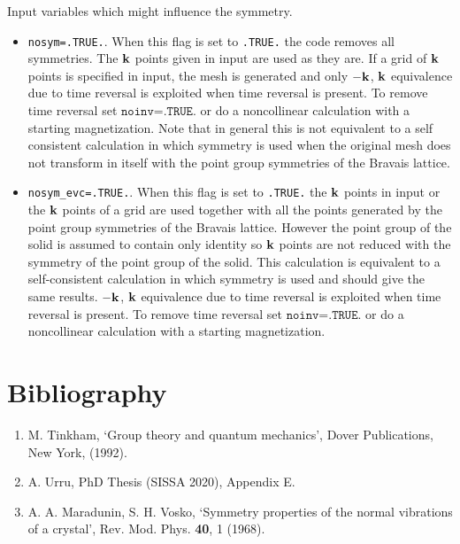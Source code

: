 \documentclass[12pt,a4paper,twoside]{report}
\begin{document}
Input variables which might influence the symmetry. 

\begin{itemize}
\item
\texttt{nosym=.TRUE.}. When this flag is set to \texttt{.TRUE.} the code 
removes all symmetries. The ${\bf k}$ points given in input are used as 
they are. If a grid of ${\bf k}$ points is specified in input, the mesh
is generated and only $-{\bf k}$, ${\bf k}$ 
equivalence due to time reversal is exploited when time reversal is present.
To remove time reversal set $\texttt{noinv=.TRUE.}$ or do a noncollinear
calculation with a starting magnetization. 
Note that in general this is not equivalent to a self consistent calculation
in which symmetry is used when the original mesh does not transform in
itself with the point group symmetries of the Bravais lattice.

\item
\texttt{nosym\_evc=.TRUE.}. When this flag is set to \texttt{.TRUE.}
the ${\bf k}$ points in input or the ${\bf k}$ points of a grid are
used together with all the points generated by the point group symmetries
of the Bravais lattice. However the point group of the solid is assumed
to contain only identity so ${\bf k}$ points are not reduced with
the symmetry of the point group of the solid. This calculation is 
equivalent to a self-consistent calculation in which symmetry is used
and should give the same results. $-{\bf k}$, ${\bf k}$
equivalence due to time reversal is exploited when time reversal is
present. To remove time reversal set $\texttt{noinv=.TRUE.}$ or do a 
noncollinear calculation with a starting magnetization.


\end{itemize}

{\color{dark-blue}\chapter{Bibliography}}
\color{black}

\begin{enumerate}

\item
M. Tinkham, `Group theory and quantum mechanics', Dover Publications, New York,
(1992). 

\item
A. Urru, PhD Thesis (SISSA 2020), Appendix E.

\item 
A. A. Maradunin, S. H. Vosko, `Symmetry properties of the normal vibrations of a crystal', Rev. Mod. Phys.
{\bf 40}, 1 (1968).
\end{enumerate}
\end{document}
